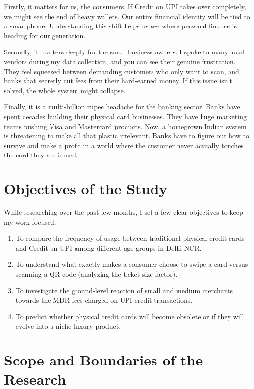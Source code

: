 Firstly, it matters for us, the consumers. If Credit on UPI takes over completely, we might see the end of heavy wallets. Our entire financial identity will be tied to a smartphone. Understanding this shift helps us see where personal finance is heading for our generation.

Secondly, it matters deeply for the small business owners. I spoke to many local vendors during my data collection, and you can see their genuine frustration. They feel squeezed between demanding customers who only want to scan, and banks that secretly cut fees from their hard-earned money. If this issue isn't solved, the whole system might collapse.

Finally, it is a multi-billion rupee headache for the banking sector. Banks have spent decades building their physical card businesses. They have huge marketing teams pushing Visa and Mastercard products. Now, a homegrown Indian system is threatening to make all that plastic irrelevant. Banks have to figure out how to survive and make a profit in a world where the customer never actually touches the card they are issued.

\section{Objectives of the Study}

While researching over the past few months, I set a few clear objectives to keep my work focused:
\begin{enumerate}
    \item To compare the frequency of usage between traditional physical credit cards and Credit on UPI among different age groups in Delhi NCR.
    \item To understand what exactly makes a consumer choose to swipe a card versus scanning a QR code (analyzing the ticket-size factor).
    \item To investigate the ground-level reaction of small and medium merchants towards the MDR fees charged on UPI credit transactions.
    \item To predict whether physical credit cards will become obsolete or if they will evolve into a niche luxury product.
\end{enumerate}

\section{Scope and Boundaries of the Research}

